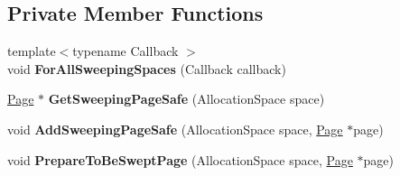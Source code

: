 \subsection*{Private Member Functions}
\begin{DoxyCompactItemize}
\item 
{\footnotesize template$<$typename Callback $>$ }\\void {\bfseries For\+All\+Sweeping\+Spaces} (Callback callback)\hypertarget{classv8_1_1internal_1_1_mark_compact_collector_1_1_sweeper_aa2c4f897399ae8b2a4a040622258de62}{}\label{classv8_1_1internal_1_1_mark_compact_collector_1_1_sweeper_aa2c4f897399ae8b2a4a040622258de62}

\item 
\hyperlink{classv8_1_1internal_1_1_page}{Page} $\ast$ {\bfseries Get\+Sweeping\+Page\+Safe} (Allocation\+Space space)\hypertarget{classv8_1_1internal_1_1_mark_compact_collector_1_1_sweeper_a7ee336c2c7ab0b76805013cca4ccd8f8}{}\label{classv8_1_1internal_1_1_mark_compact_collector_1_1_sweeper_a7ee336c2c7ab0b76805013cca4ccd8f8}

\item 
void {\bfseries Add\+Sweeping\+Page\+Safe} (Allocation\+Space space, \hyperlink{classv8_1_1internal_1_1_page}{Page} $\ast$page)\hypertarget{classv8_1_1internal_1_1_mark_compact_collector_1_1_sweeper_aadd3ef32dcd27490f842363f37aa4658}{}\label{classv8_1_1internal_1_1_mark_compact_collector_1_1_sweeper_aadd3ef32dcd27490f842363f37aa4658}

\item 
void {\bfseries Prepare\+To\+Be\+Swept\+Page} (Allocation\+Space space, \hyperlink{classv8_1_1internal_1_1_page}{Page} $\ast$page)\hypertarget{classv8_1_1internal_1_1_mark_compact_collector_1_1_sweeper_a9e3dfac3abf7cda9c43b60fdd3fe8bae}{}\label{classv8_1_1internal_1_1_mark_compact_collector_1_1_sweeper_a9e3dfac3abf7cda9c43b60fdd3fe8bae}

\end{DoxyCompactItemize}

